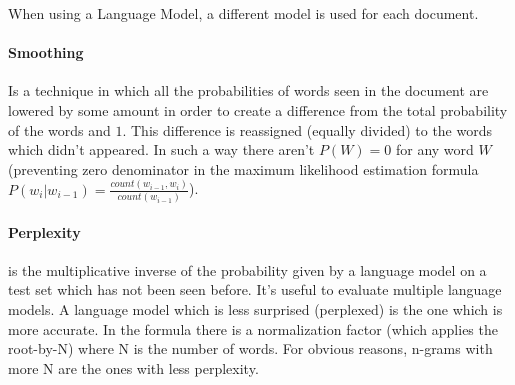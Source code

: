 When using a Language Model, a different model is used for each document.

\paragraph{Smoothing} Is a technique in which all the probabilities of words seen in the document are lowered by some amount in order to create a difference from the total probability of the words and $1$. This difference is reassigned (equally divided) to the words which didn't appeared. In such a way there aren't $P(W) = 0$ for any word $W$ (preventing zero denominator in the maximum likelihood estimation formula $P(w_i | w_{i-1}) = \frac {count(w_{i-1}, w_i)} {count(w_{i-1})}$).

\paragraph{Perplexity} is the multiplicative inverse of the probability given by a language model on a test set which has not been seen before. It's useful to evaluate multiple language models. A language model which is less surprised (perplexed) is the one which is more accurate. In the formula there is a normalization factor (which applies the root-by-N) where N is the number of words.
For obvious reasons, n-grams with more N are the ones with less perplexity.
